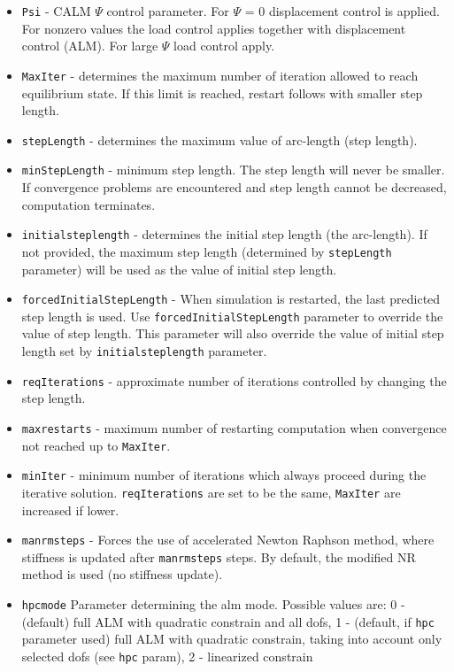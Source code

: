 \documentclass[a4paper]{report}
\newcommand{\param}[1]{\texttt{#1}} %
\begin{document}
\begin{itemize}
\item \param{Psi} - CALM $\Psi$ control parameter. For $\Psi$ = 0
displacement control is applied. For nonzero values the load control
applies together with displacement control (ALM). For large $\Psi$
load control apply.
\item \param{MaxIter} - determines the maximum number of iteration allowed to
reach equilibrium state. If this limit is reached, restart follows
with smaller step length.
\item \param{stepLength} - determines the maximum value of arc-length (step length).
\item \param{min\-Step\-Le\-ngth} - minimum step length. The step length will never be
smaller. If convergence problems are encountered and step length cannot
be decreased, computation terminates.
\item \param{initialsteplength} - determines the initial step length (the arc-length). If not provided, the maximum step length (determined by \param{stepLength} parameter) will be used as the value of initial step length. 
\item \param{forcedInitialStepLength} - When simulation is restarted, the last predicted step length is used. Use \param{forcedInitialStepLength} parameter to override the value of step length. This parameter will also override the value of initial step length set by \param{initialsteplength} parameter.
\item \param{reqIterations} - approximate number of iterations controlled by changing the step length.
\item \param{maxrestarts} - maximum number of restarting computation when convergence not reached up to \param{MaxIter}.
\item \param{minIter} - minimum number of iterations which always proceed during the iterative solution. \param{reqIterations} are set to be the same, \param{MaxIter} are increased if lower.
\item \param{manrmsteps} - Forces the use of accelerated
Newton Raphson met\-hod, where stiffness is updated after
\param{manrmsteps} steps. By default, the modified NR
method is used (no stiffness update).
\item \param{hpcmode} Parameter determining the alm mode.
Possible values are: 0 - (default) full ALM with quadratic constrain and
all dofs, 1 - (default, if \param{hpc} parameter used) full ALM with quadratic constrain, taking into account
only selected dofs (see \param{hpc} param), 2 - linearized constrain

\end{itemize}
\end{document}
